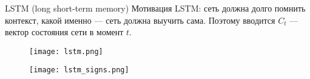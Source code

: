\documentclass[unicode,9pt, pdf]{beamer}
\begin{document}
    \begin{frame}{LSTM (long short-term memory)}
        Мотивация LSTM: сеть должна долго помнить контекст, какой именно --- сеть должна выучить сама. Поэтому вводится $C_t$ --- вектор состояния сети в момент $t$.\\
        
        \begin{figure}[h]
	\begin{center}
		\texttt{[image: lstm.png]}
	\end{center}
\end{figure}
        \begin{figure}[h]
	\begin{center}
		\texttt{[image: lstm\_signs.png]}
	\end{center}
\end{figure}
        \end{frame}
	
\end{document}
